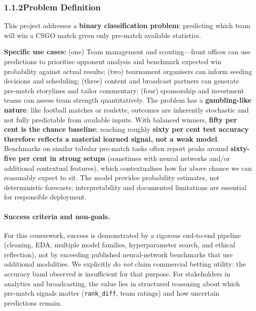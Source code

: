 \documentclass[12pt,a4paper]{article}
\begin{document}
\subsubsection{1.1.2\quad Problem Definition}

This project addresses a \textbf{binary classification problem}: predicting which team will win a CSGO match given only pre-match available statistics.

\textbf{Specific use cases:} (one) Team management and scouting---front offices can use predictions to prioritise opponent analysis and benchmark expected win probability against actual results; (two) tournament organisers can inform seeding decisions and scheduling; (three) content and broadcast partners can generate pre-match storylines and tailor commentary; (four) sponsorship and investment teams can assess team strength quantitatively. The problem has a \textbf{gambling-like nature}: like football matches or roulette, outcomes are inherently stochastic and not fully predictable from available inputs. With balanced winners, \textbf{fifty per cent is the chance baseline}; reaching roughly \textbf{sixty per cent test accuracy therefore reflects a material learned signal, not a weak model}. Benchmarks on similar tabular pre-match tasks often report peaks around \textbf{sixty-five per cent in strong setups} (sometimes with neural networks and/or additional contextual features), which contextualises how far above chance we can reasonably expect to sit. The model provides probability estimates, not deterministic forecasts; interpretability and documented limitations are essential for responsible deployment.

\paragraph{Success criteria and non-goals.}
For this coursework, success is demonstrated by a rigorous end-to-end pipeline (cleaning, EDA, multiple model families, hyperparameter search, and ethical reflection), not by exceeding published neural-network benchmarks that use additional modalities. We explicitly do \textit{not} claim commercial betting utility: the accuracy band observed is insufficient for that purpose. For stakeholders in analytics and broadcasting, the value lies in structured reasoning about which pre-match signals matter (\texttt{rank\_diff}, team ratings) and how uncertain predictions remain.

\end{document}

